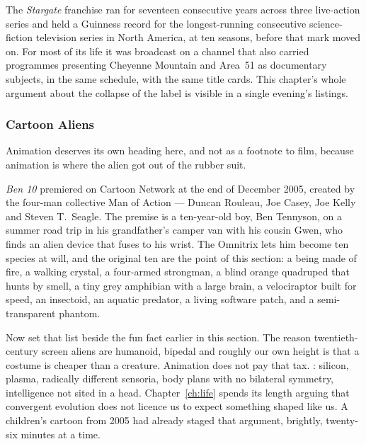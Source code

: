 \begin{funfact}
The \emph{Stargate} franchise ran for seventeen consecutive years across three live-action series and
held a Guinness record for the longest-running consecutive science-fiction television series in North
America, at ten seasons, before that mark moved on. For most of its life it was broadcast on a channel
that also carried programmes presenting Cheyenne Mountain and Area~51 as documentary subjects, in the
same schedule, with the same title cards. This chapter's whole argument about the collapse of the
label is visible in a single evening's listings.
\end{funfact}

\subsubsection{Cartoon Aliens}

Animation deserves its own heading here, and not as a footnote to film, because animation is where
the alien got out of the rubber suit.

\emph{Ben 10} premiered on Cartoon Network at the end of December 2005, created by the four-man
collective Man of Action --- Duncan Rouleau, Joe Casey, Joe Kelly and Steven T.\ Seagle. The premise
is a ten-year-old boy, Ben Tennyson, on a summer road trip in his grandfather's camper van with his
cousin Gwen, who finds an alien device that fuses to his wrist. The Omnitrix lets him become ten
species at will, and the original ten are the point of this section: a being made of fire, a walking
crystal, a four-armed strongman, a blind orange quadruped that hunts by smell, a tiny grey amphibian
with a large brain, a velociraptor built for speed, an insectoid, an aquatic predator, a living
software patch, and a semi-transparent phantom.

Now set that list beside the fun fact earlier in this section. The reason twentieth-century screen
aliens are humanoid, bipedal and roughly our own height is that a costume is cheaper than a creature.
Animation does not pay that tax. : silicon, plasma,
radically different sensoria, body plans with no bilateral symmetry, intelligence not sited in a head.
Chapter~\ref{ch:life} spends its length arguing that convergent evolution does not licence us to expect
something shaped like us. A children's cartoon from 2005 had already staged that argument, brightly,
twenty-six minutes at a time.


